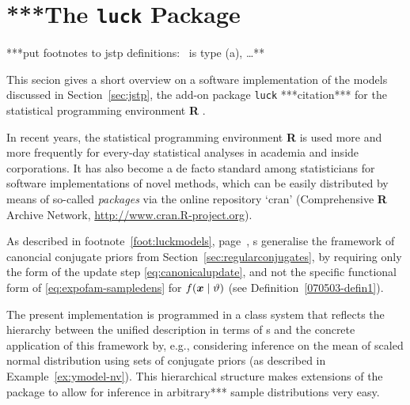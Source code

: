 \section{***The \texttt{luck} Package} %
\label{sec:luck}


***put footnotes to jstp definitions: \ymodel\ is type (a), \ldots***


This secion gives a short overview on a software implementation of the models discussed in Section~\ref{sec:jstp},
the add-on package \texttt{luck} ***citation*** for the statistical programming environment \textbf{R} \parencite{2013:r}.

In recent years, the statistical programming environment %
\textbf{R} is used more and more frequently for every-day statistical analyses
in academia and inside corporations. %
It has also become a de facto standard among
statisticians for software implementations of novel methods,
which can be easily distributed by means of so-called \emph{packages}
via the online repository `cran' (Comprehensive \textbf{R} Archive Network, \url{http://www.cran.R-project.org}).

As described in footnote~\ref{foot:luckmodels}, page~\pageref{foot:luckmodels},
\model s generalise the framework
of canoncial conjugate priors from Section~\ref{sec:regularconjugates},
by requiring only the form of the update step \eqref{eq:canonicalupdate},
and not the specific functional form of \eqref{eq:expofam-sampledens} for $f({\bm x} \mid \vartheta)$
(see Definition~\ref{070503-defin1}).

The present implementation is programmed in a class system
that reflects %
the hierarchy between the unified description in terms of \model s %
and the concrete application of this framework by, e.g.,
considering inference on the mean of scaled normal distribution using sets of conjugate priors
(as described in Example~\ref{ex:ymodel-nv}).
This hierarchical structure makes extensions of the package
to allow for inference in arbitrary*** sample distributions very easy.

